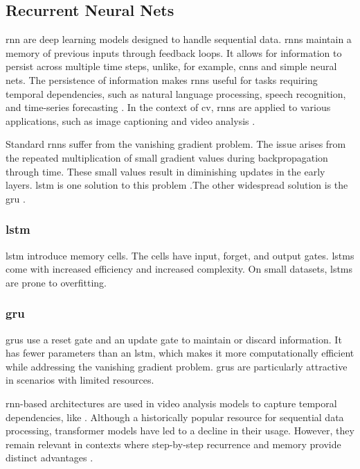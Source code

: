 \subsection{Recurrent Neural Nets}

\acrfull{rnn} are deep learning models designed to handle sequential data. \acrshort{rnn}s maintain a memory of previous inputs through feedback loops. It allows for information to persist across multiple time steps, unlike, for example, \acrshort{cnn}s and simple neural nets. The persistence of information makes \acrshort{rnn}s useful for tasks requiring temporal dependencies, such as natural language processing, speech recognition, and time-series forecasting \cite{ibm_rnn_2025}. In the context of \acrfull{cv}, \acrshort{rnn}s are applied to various applications, such as image captioning and video analysis \cite{agyeman_soccer_2019}. 

Standard \acrshort{rnn}s suffer from the vanishing gradient problem. The issue arises from the repeated multiplication of small gradient values during backpropagation through time. These small values result in diminishing updates in the early layers. \acrfull{lstm} is one solution to this problem \cite{bhogal_human_2023, kumar_human_2023, mahaseni_spotting_2021}.The other widespread solution is the \acrfull{gru} \cite{giveki_human_2024,li_oarnet_2024,yu_i3d_2023}. 

\subsubsection{\acrfull{lstm}}
\acrlong{lstm} introduce memory cells. The cells have input, forget, and output gates. \acrshort{lstm}s come with increased efficiency and increased complexity. On small datasets, \acrshort{lstm}s are prone to overfitting. 

\subsubsection{\acrfull{gru}}
\acrlong{gru}s use a reset gate and an update gate to maintain or discard information\cite{cho_gru_2014}. It has fewer parameters than an \acrshort{lstm}, which makes it more computationally efficient while addressing the vanishing gradient problem. \acrshort{gru}s are particularly attractive in scenarios with limited resources. 

\acrshort{rnn}-based architectures are used in video analysis models to capture temporal dependencies, like \textcite{bhogal_human_2023}. Although a historically popular resource for sequential data processing, transformer models have led to a decline in their usage. However, they remain relevant in contexts where step-by-step recurrence and memory provide distinct advantages \cite{ibm_rnn_2025}.


